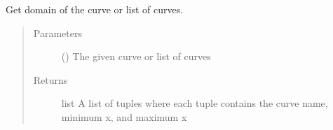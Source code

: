 \documentclass[letterpaper,10pt,english]{sphinxmanual}
\begin{document}
\begin{fulllineitems}
\label{\detokenize{pydv:pydvpy.getdomain}}
Get domain of the curve or list of curves.

\begin{sphinxVerbatim}[commandchars=\\\{\}]
  
\end{sphinxVerbatim}

\begin{sphinxVerbatim}[commandchars=\\\{\}]
  
\end{sphinxVerbatim}

\begin{sphinxVerbatim}[commandchars=\\\{\}]
    \PYG{p}{[}\PYG{p}{]}
\end{sphinxVerbatim}
\begin{quote}\begin{description}
\item[{Parameters}] \leavevmode
{} ({\hyperref[\detokenize{pydv:curve.Curve}]{}}) \textendash{} The given curve or list of curves

\item[{Returns}] \leavevmode
list \textendash{} A list of tuples where each tuple contains the curve name, minimum x, and maximum x

\end{description}\end{quote}

\end{fulllineitems}

\end{document}
